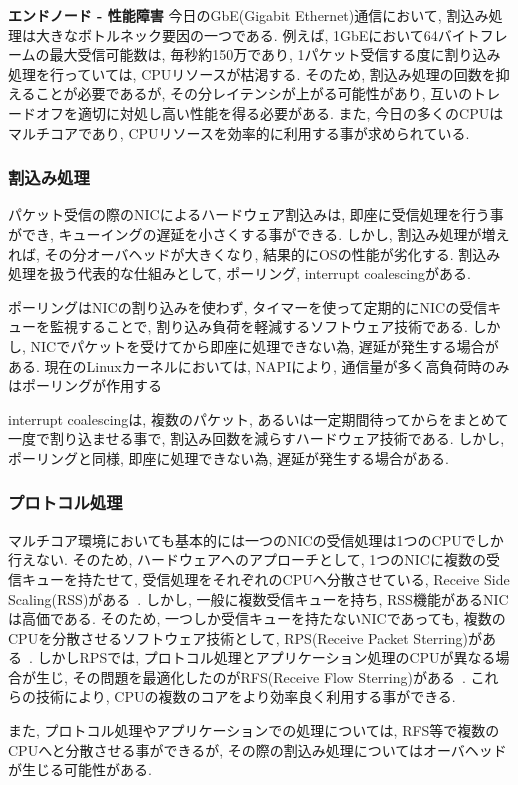 \documentclass[11pt, a4paper, twocolumn]{jsarticle}
\begin{document}
{\bf エンドノード - 性能障害}
今日のGbE(Gigabit Ethernet)通信において, 割込み処理は大きなボトルネック要因の一つである.
例えば, 1GbEにおいて64バイトフレームの最大受信可能数は, 毎秒約150万であり, 1パケット受信する度に割り込み処理を行っていては,
CPUリソースが枯渇する.
そのため, 割込み処理の回数を抑えることが必要であるが, その分レイテンシが上がる可能性があり, 互いのトレードオフを適切に対処し高い性能を得る必要がある.
また, 今日の多くのCPUはマルチコアであり, CPUリソースを効率的に利用する事が求められている.
\subsubsection{割込み処理}
パケット受信の際のNICによるハードウェア割込みは, 即座に受信処理を行う事ができ, キューイングの遅延を小さくする事ができる.
しかし, 割込み処理が増えれば, その分オーバヘッドが大きくなり, 結果的にOSの性能が劣化する.
割込み処理を扱う代表的な仕組みとして, ポーリング, interrupt coalescingがある.

ポーリングはNICの割り込みを使わず, タイマーを使って定期的にNICの受信キューを監視することで, 割り込み負荷を軽減するソフトウェア技術である.
しかし, NICでパケットを受けてから即座に処理できない為, 遅延が発生する場合がある.
現在のLinuxカーネルにおいては, NAPIにより, 通信量が多く高負荷時のみはポーリングが作用する~\cite{NAPI}

interrupt coalescingは, 複数のパケット, あるいは一定期間待ってからをまとめて一度で割り込ませる事で,
割込み回数を減らすハードウェア技術である.
しかし, ポーリングと同様, 即座に処理できない為, 遅延が発生する場合がある.

\subsubsection{プロトコル処理}
マルチコア環境においても基本的には一つのNICの受信処理は1つのCPUでしか行えない.
そのため, ハードウェアへのアプローチとして, 1つのNICに複数の受信キューを持たせて, 受信処理をそれぞれのCPUへ分散させている, Receive
Side Scaling(RSS)がある~\cite{RSS}.
しかし, 一般に複数受信キューを持ち, RSS機能があるNICは高価である\cite{intel}.
そのため, 一つしか受信キューを持たないNICであっても, 複数のCPUを分散させるソフトウェア技術として, RPS(Receive Packet
Sterring)がある~\cite{RPS}.
しかしRPSでは, プロトコル処理とアプリケーション処理のCPUが異なる場合が生じ, その問題を最適化したのがRFS(Receive Flow
Sterring)がある~\cite{RFS}.
これらの技術により, CPUの複数のコアをより効率良く利用する事ができる.

また, プロトコル処理やアプリケーションでの処理については, RFS等で複数のCPUへと分散させる事ができるが,
その際の割込み処理についてはオーバヘッドが生じる可能性がある.
\end{document}
